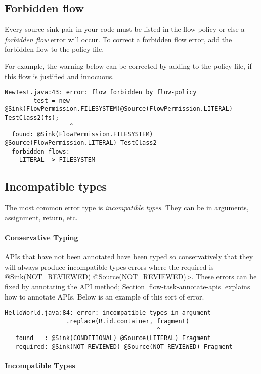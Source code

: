 \subsection{Forbidden flow}  
Every source-sink pair in your code must be listed in the flow policy or else a \emph{forbidden flow} error will occur.
To correct a forbidden flow error, add the forbidden flow to the policy file. 
  
For example, the warning below can be corrected by adding   to the policy file, if this flow is justified and innocuous. 
\begin{Verbatim}
NewTest.java:43: error: flow forbidden by flow-policy  
        test = new @Sink(FlowPermission.FILESYSTEM)@Source(FlowPermission.LITERAL) TestClass2(fs);
                  ^
  found: @Sink(FlowPermission.FILESYSTEM) @Source(FlowPermission.LITERAL) TestClass2 
  forbidden flows:
    LITERAL -> FILESYSTEM
\end{Verbatim}

\subsection{Incompatible types}
The most common error type is \emph{incompatible types}.  They can be in arguments,  assignment, return, etc.

\paragraph{Conservative Typing}

APIs that have not been annotated have been typed so conservatively that they will always produce incompatible types errors where the required is \<@Sink(NOT\_REVIEWED) @Source(NOT\_REVIEWED)>.  These errors can be fixed by annotating the API method; 
Section \ref{flow-task-annotate-apis} explains how to annotate APIs. 
Below is an example of this sort of error.

\begin{Verbatim}
HelloWorld.java:84: error: incompatible types in argument
                 .replace(R.id.container, fragment)
                                          ^
   found   : @Sink(CONDITIONAL) @Source(LITERAL) Fragment
   required: @Sink(NOT_REVIEWED) @Source(NOT_REVIEWED) Fragment
\end{Verbatim}

\paragraph{Incompatible Types}

